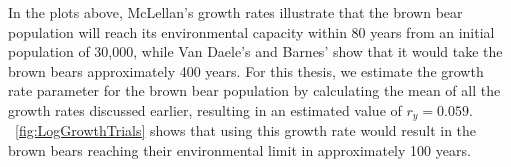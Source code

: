 In the plots above, McLellan's growth rates illustrate that the brown bear population will reach its environmental capacity within 80 years from an initial population of 30,000, while Van Daele's and Barnes' show that it would take the brown bears approximately 400 years.
For this thesis, we estimate the growth rate parameter for the brown bear population by calculating the mean of all the growth rates discussed earlier, resulting in an estimated value of $r_y=0.059$.
\figureautorefname~\ref{fig:LogGrowthTrials} shows that using this growth rate would result in the brown bears reaching their environmental limit in approximately 100 years.